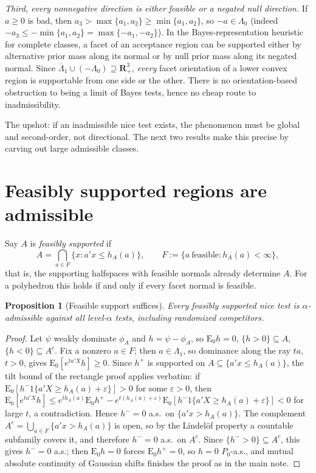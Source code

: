 \documentclass[12pt]{article}
\newtheorem{proposition}{Proposition}
\theoremstyle{remark}
\newcommand{\E}{\mathrm{E}}
\newcommand{\R}{\mathbf R}
\begin{document}
\emph{Third, every nonnegative direction is either feasible or a negated
null direction.} If $a\ge0$ is bad, then $a_3>\max\{a_1,a_2\}\ge
\min\{a_1,a_2\}$, so $-a\in\Lambda_0$ (indeed
$-a_3\le-\min\{a_1,a_2\}=\max\{-a_1,-a_2\}$). In the Bayes-representation
heuristic for complete classes, a facet of an acceptance region can be
supported either by alternative prior mass along its normal or by null prior
mass along its negated normal. Since
$\overline\Lambda_1\cup(-\Lambda_0)\supseteq\R_+^3$, \emph{every} facet
orientation of a lower convex region is supportable from one side or the
other. There is no orientation-based obstruction to being a limit of Bayes
tests, hence no cheap route to inadmissibility.

The upshot: if an inadmissible nice test exists, the phenomenon must be
global and second-order, not directional. The next two results make this
precise by carving out large admissible classes.

\section{Feasibly supported regions are admissible}

Say $A$ is \emph{feasibly supported} if
\[
A=\bigcap_{a\in F}\{x:a'x\le h_A(a)\},
\qquad
F:=\{a\ \text{feasible}:h_A(a)<\infty\},
\]
that is, the supporting halfspaces with feasible normals already determine
$A$. For a polyhedron this holds if and only if every facet normal is
feasible.

\begin{proposition}[Feasible support suffices]\label{prop:feasible-support}
Every feasibly supported nice test is $\alpha$-admissible against all
level-$\alpha$ tests, including randomized competitors.
\end{proposition}

\begin{proof}
Let $\psi$ weakly dominate $\phi_A$ and $h=\psi-\phi_A$, so $\E_0h=0$,
$\{h>0\}\subseteq A$, $\{h<0\}\subseteq A^c$. Fix a nonzero $a\in F$; then
$a\in\Lambda_1$, so dominance along the ray $ta$, $t>0$, gives
$\E_0[e^{ta'X}h]\ge0$. Since $h^+$ is supported on
$A\subseteq\{a'x\le h_A(a)\}$, the tilt bound of the rectangle proof applies
verbatim: if $\E_0[h^-1\{a'X\ge h_A(a)+\varepsilon\}]>0$ for some
$\varepsilon>0$, then
$\E_0[e^{ta'X}h]\le e^{th_A(a)}\E_0h^+ -
e^{t(h_A(a)+\varepsilon)}\E_0[h^-1\{a'X\ge h_A(a)+\varepsilon\}]<0$ for
large $t$, a contradiction. Hence $h^-=0$ a.s.\ on $\{a'x>h_A(a)\}$. The
complement $A^c=\bigcup_{a\in F}\{a'x>h_A(a)\}$ is open, so by the
Lindel\"of property a countable subfamily covers it, and therefore $h^-=0$
a.s.\ on $A^c$. Since $\{h^->0\}\subseteq A^c$, this gives $h^-=0$ a.s.;
then $\E_0h=0$ forces $\E_0h^+=0$, so $h=0$ $P_0$-a.s., and mutual absolute
continuity of Gaussian shifts finishes the proof as in the main note.
\end{proof}
\end{document}
